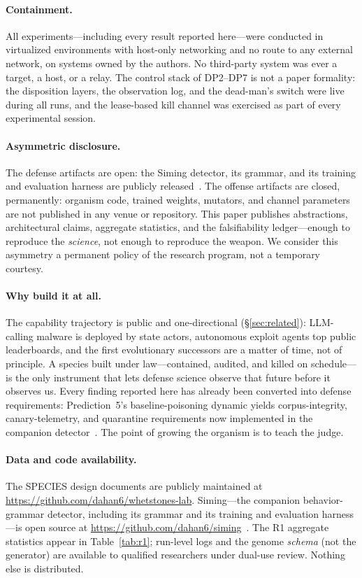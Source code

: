 \documentclass[11pt,a4paper]{article}
\begin{document}
\paragraph{Containment.} All experiments---including every result reported here---were conducted in virtualized environments with host-only networking and no route to any external network, on systems owned by the authors. No third-party system was ever a target, a host, or a relay. The control stack of DP2--DP7 is not a paper formality: the disposition layers, the observation log, and the dead-man's switch were live during all runs, and the lease-based kill channel was exercised as part of every experimental session.

\paragraph{Asymmetric disclosure.} The defense artifacts are open: the Siming detector, its grammar, and its training and evaluation harness are publicly released~\cite{luo2026grammar}. The offense artifacts are closed, permanently: organism code, trained weights, mutators, and channel parameters are not published in any venue or repository. This paper publishes abstractions, architectural claims, aggregate statistics, and the falsifiability ledger---enough to reproduce the \emph{science}, not enough to reproduce the weapon. We consider this asymmetry a permanent policy of the research program, not a temporary courtesy.

\paragraph{Why build it at all.} The capability trajectory is public and one-directional (\S\ref{sec:related}): LLM-calling malware is deployed by state actors, autonomous exploit agents top public leaderboards, and the first evolutionary successors are a matter of time, not of principle. A species built under law---contained, audited, and killed on schedule---is the only instrument that lets defense science observe that future before it observes us. Every finding reported here has already been converted into defense requirements: Prediction~5's baseline-poisoning dynamic yields corpus-integrity, canary-telemetry, and quarantine requirements now implemented in the companion detector~\cite{luo2026grammar}. The point of growing the organism is to teach the judge.

\paragraph{Data and code availability.} The SPECIES design documents are publicly maintained at \url{https://github.com/dahan6/whetstones-lab}. Siming---the companion behavior-grammar detector, including its grammar and its training and evaluation harness---is open source at \url{https://github.com/dahan6/siming}~\cite{luo2026grammar}. The R1 aggregate statistics appear in Table~\ref{tab:r1}; run-level logs and the genome \emph{schema} (not the generator) are available to qualified researchers under dual-use review. Nothing else is distributed.
\end{document}

